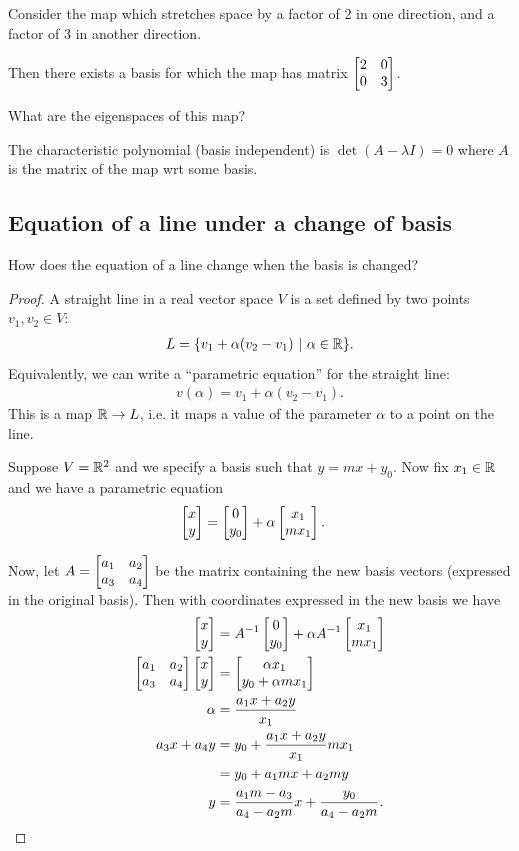 
\newpage
Consider the map which stretches space by a factor of 2 in one direction, and a
factor of 3 in another direction.

Then there exists a basis for which the map has matrix
$
\begin{bmatrix}2 & 0\\0 & 3\\ \end{bmatrix}
$.

What are the eigenspaces of this map?

The characteristic polynomial (basis independent) is $\det(A - \lambda I) = 0$
where $A$ is the matrix of the map wrt some basis.


\subsection{Equation of a line under a change of basis} \label{equation-of-line-under-change-of-basis}
\begin{question*}
  How does the equation of a line change when the basis is changed?
\end{question*}

\begin{proof}
  A straight line in a real vector space $V$ is a set defined by two points $v_1, v_2 \in V$:
  \begin{align*}
    L = \{v_1 + \alpha(v_2 - v_1) ~|~ \alpha \in \mathbb{R} \}.
  \end{align*}
  Equivalently, we can write a ``parametric equation'' for the straight line:
  \begin{align*}
    v(\alpha) = v_1 + \alpha(v_2 - v_1).
  \end{align*}
  This is a map $\mathbb{R} \to L$, i.e. it maps a value of the parameter $\alpha$ to a point on the line.

  Suppose $V = \mathbb{R}^2$ and we specify a basis such that $y = mx + y_0$. Now fix $x_1 \in \mathbb{R}$ and we
  have a parametric equation
  \begin{align*}
    \begin{bmatrix}x\\y\end{bmatrix} &= \begin{bmatrix}0\\y_0\end{bmatrix} + \alpha\begin{bmatrix}x_1\\mx_1\end{bmatrix}.
  \end{align*}

  Now, let $A = \begin{bmatrix}a_1 & a_2\\a_3 & a_4\\ \end{bmatrix}$ be the matrix containing the new basis vectors
  (expressed in the original basis). Then with coordinates expressed in the new basis we have
  \begin{align*}
    \begin{bmatrix}x\\y\end{bmatrix}                    &= A^{-1}\begin{bmatrix}0\\y_0\end{bmatrix} + \alpha A^{-1}\begin{bmatrix}x_1\\mx_1\end{bmatrix} \\
    \begin{bmatrix}a_1 & a_2\\a_3 & a_4\\ \end{bmatrix}\begin{bmatrix}x\\y\end{bmatrix} &= \begin{bmatrix}\alpha x_1\\y_0 + \alpha mx_1\end{bmatrix} \\
    \alpha &= \frac{a_1x + a_2y}{x_1} \\
    a_3x + a_4y &= y_0 + \frac{a_1x + a_2y}{x_1} mx_1 \\
                &= y_0 + a_1mx + a_2my \\
    y &= \frac{a_1m - a_3}{a_4 - a_2m}x + \frac{y_0}{a_4 - a_2m}.
  \end{align*}
\end{proof}

